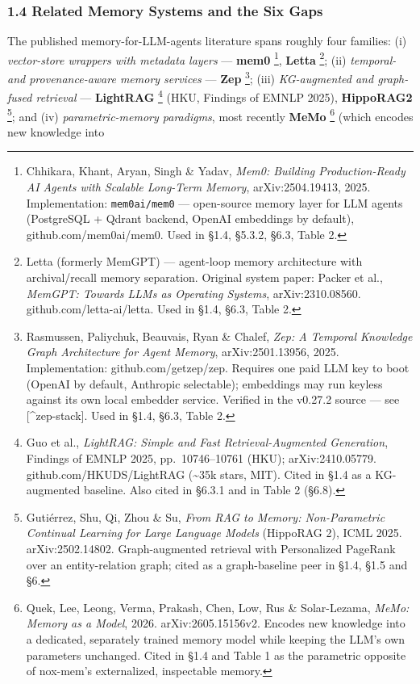 \documentclass[
]{article}
\begin{document}
\subsubsection{1.4 Related Memory Systems and the Six
Gaps}\label{related-memory-systems-and-the-six-gaps}

The published memory-for-LLM-agents literature spans roughly four
families: (i) \emph{vector-store wrappers with metadata layers} ---
\textbf{mem0} \footnote{Chhikara, Khant, Aryan, Singh \& Yadav,
  \emph{Mem0: Building Production-Ready AI Agents with Scalable
  Long-Term Memory}, arXiv:2504.19413, 2025. Implementation:
  \texttt{mem0ai/mem0} --- open-source memory layer for LLM agents
  (PostgreSQL + Qdrant backend, OpenAI embeddings by default),
  github.com/mem0ai/mem0. Used in §1.4, §5.3.2, §6.3, Table 2.},
\textbf{Letta} \footnote{Letta (formerly MemGPT) --- agent-loop memory
  architecture with archival/recall memory separation. Original system
  paper: Packer et al., \emph{MemGPT: Towards LLMs as Operating
  Systems}, arXiv:2310.08560. github.com/letta-ai/letta. Used in §1.4,
  §6.3, Table 2.}; (ii) \emph{temporal- and provenance-aware memory
services} --- \textbf{Zep} \footnote{Rasmussen, Paliychuk, Beauvais,
  Ryan \& Chalef, \emph{Zep: A Temporal Knowledge Graph Architecture for
  Agent Memory}, arXiv:2501.13956, 2025. Implementation:
  github.com/getzep/zep. Requires one paid LLM key to boot (OpenAI by
  default, Anthropic selectable); embeddings may run keyless against its
  own local embedder service. Verified in the v0.27.2 source --- see
  {[}\^{}zep-stack{]}. Used in §1.4, §6.3, Table 2.}; (iii)
\emph{KG-augmented and graph-fused retrieval} --- \textbf{LightRAG}
\footnote{Guo et al., \emph{LightRAG: Simple and Fast
  Retrieval-Augmented Generation}, Findings of EMNLP 2025,
  pp.~10746--10761 (HKU); arXiv:2410.05779. github.com/HKUDS/LightRAG
  (\textasciitilde35k stars, MIT). Cited in §1.4 as a KG-augmented
  baseline. Also cited in §6.3.1 and in Table 2 (§6.8).} (HKU, Findings
of EMNLP 2025), \textbf{HippoRAG2} \footnote{Gutiérrez, Shu, Qi, Zhou \&
  Su, \emph{From RAG to Memory: Non-Parametric Continual Learning for
  Large Language Models} (HippoRAG 2), ICML 2025. arXiv:2502.14802.
  Graph-augmented retrieval with Personalized PageRank over an
  entity-relation graph; cited as a graph-baseline peer in §1.4, §1.5
  and §6.}; and (iv) \emph{parametric-memory paradigms}, most recently
\textbf{MeMo} \footnote{Quek, Lee, Leong, Verma, Prakash, Chen, Low, Rus
  \& Solar-Lezama, \emph{MeMo: Memory as a Model}, 2026.
  arXiv:2605.15156v2. Encodes new knowledge into a dedicated, separately
  trained memory model while keeping the LLM's own parameters unchanged.
  Cited in §1.4 and Table 1 as the parametric opposite of nox-mem's
  externalized, inspectable memory.} (which encodes new knowledge into
\end{document}
